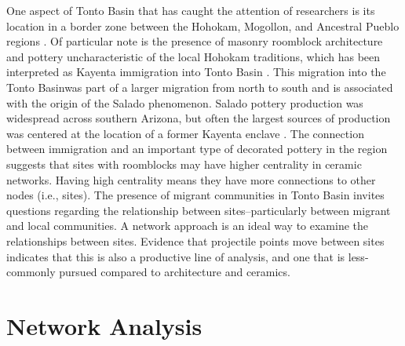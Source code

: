 \documentclass[]{interact}
\theoremstyle{plain}%
\theoremstyle{definition}
\theoremstyle{remark}
\begin{document}
One aspect of Tonto Basin that has caught the attention of researchers
is its location in a border zone between the Hohokam, Mogollon, and
Ancestral Pueblo regions
\citep[e.g.,][]{Caseldine2022-uu, Clark2001-ck, Elson1994-hk, Hill2015-at, Huntley2016-em, Lyons2012-pr, Lyons2013-ya, Neuzil2008-zd, Wood2000-ze}.
Of particular note is the presence of masonry roomblock architecture and
pottery uncharacteristic of the local Hohokam traditions, which has been
interpreted as Kayenta immigration into Tonto Basin
\citep{Clark2001-ck, Lyons2003-yy, Lyons2006-to, Stark1998-mu}. This
migration into the Tonto Basinwas part of a larger migration from north
to south and is associated with the origin of the Salado phenomenon.
Salado pottery production was widespread across southern Arizona, but
often the largest sources of production was centered at the location of
a former Kayenta enclave
\citep{Hill2015-at, Huntley2016-em, Lyons2012-pr, Neuzil2008-zd}. The
connection between immigration and an important type of decorated
pottery in the region suggests that sites with roomblocks may have
higher centrality in ceramic networks. Having high centrality means they
have more connections to other nodes (i.e., sites). The presence of
migrant communities in Tonto Basin invites questions regarding the
relationship between sites--particularly between migrant and local
communities. A network approach is an ideal way to examine the
relationships between sites. Evidence that projectile points move
between sites \citep[e.g.,][]{Watts2013-ub} indicates that this is also
a productive line of analysis, and one that is less-commonly pursued
compared to architecture and ceramics.

\hypertarget{network-analysis}{%
\section*{Network Analysis}\label{network-analysis}}
\end{document}
